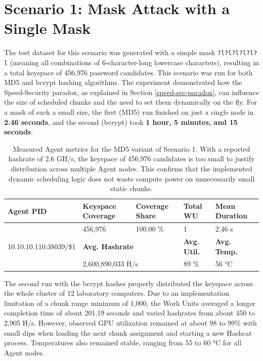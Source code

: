 \section{Scenario 1: Mask Attack with a Single Mask}

The test dataset for this scenario was generated with a simple mask \verb|?l?l?l?l?l?l| (meaning all combinations of 6-character-long lowercase characters), resulting in a total keyspace of 456,976 password candidates. This scenario was run for both MD5 and bcrypt hashing algorithms. The experiment demonstrated how the Speed-Security paradox, as explained in Section \ref{speed-sec-paradox}, can influence the size of scheduled chunks and the need to set them dynamically on the fly. For a mask of such a small size, the first (MD5) run finished on just a single node in \textbf{2.46 seconds}, and the second (bcrypt) took \textbf{1 hour, 5 minutes, and 15 seconds}.

\begin{table}[H]
    \centering
    \caption{Measured Agent metrics for the MD5 variant of Scenario 1. With a reported hashrate of 2.6 GH/s, the keyspace of 456,976 candidates is too small to justify distribution across multiple Agent nodes. This confirms that the implemented dynamic scheduling logic does not waste compute power on unnecessarily small static chunks.}
    \label{tab:scenario1_md5_md5}
    \footnotesize
    \begin{tabularx}{\textwidth}{|l|l|l|l|l|}
        \hline
         \textbf{Agent PID} & \textbf{Keyspace Coverage} & \textbf{Coverage Share} & \textbf{Total WU} & \textbf{Mean Duration} \\ \hline
         \multirow{3}{*}{10.10.10.110:38039/\$1} & 456,976 & 100.00 \% & 1 & 2.46 s \\ \cline{2-5}
          & \multicolumn{2}{l|}{\textbf{Avg. Hashrate}} & \textbf{Avg. Util.} & \textbf{Avg. Temp.} \\ \cline{2-5}
         &  \multicolumn{2}{l|}{2,600,890,033 H/s} & 89 \% & 56 °C \\ \hline
    \end{tabularx}
\end{table}

The second run with the bcrypt hashes properly distributed the keyspace across the whole cluster of 12 laboratory computers. Due to an implementation limitation of a chunk range minimum of 1,000, the Work Units averaged a longer completion time of about 201.19 seconds and varied hashrates from about 450 to 2,905 H/s. However, observed GPU utilization remained at about 98 to 99\% with small dips when loading the next chunk assignment and starting a new Hashcat process. Temperatures also remained stable, ranging from 55 to 60 °C for all Agent nodes.

